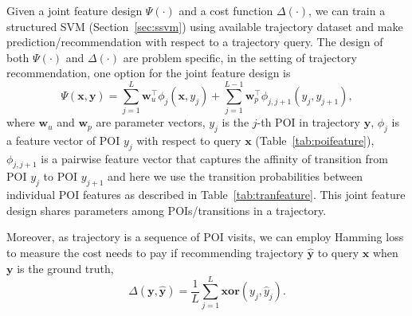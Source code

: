 \documentclass[9pt]{extarticle}
\DeclareMathOperator*{\argmax}{argmax}
\begin{document}
Given a joint feature design $\Psi(\cdot)$ and a cost function $\Delta(\cdot)$,
we can train a structured SVM (Section~\ref{sec:ssvm}) using available trajectory dataset and 
make prediction/recommendation with respect to a trajectory query.
The design of both $\Psi(\cdot)$ and $\Delta(\cdot)$ are problem specific,
in the setting of trajectory recommendation, one option for the joint feature design is
\begin{equation*}
\Psi(\mathbf{x}, \mathbf{y}) = \sum_{j=1}^L \mathbf{w}_u^\top \phi_j(\mathbf{x}, y_j) +
                               \sum_{j=1}^{L-1} \mathbf{w}_p^\top \phi_{j, j+1}(y_j, y_{j+1}),
\end{equation*}
where $\mathbf{w}_u$ and $\mathbf{w}_p$ are parameter vectors,
$y_j$ is the $j$-th POI in trajectory $\mathbf{y}$, 
$\phi_j$ is a feature vector of POI $y_j$ with respect to query $\mathbf{x}$ (Table~\ref{tab:poifeature}),
$\phi_{j,j+1}$ is a pairwise feature vector that captures the affinity of transition from POI $y_j$ to POI $y_{j+1}$ and
here we use the transition probabilities between individual POI features as described in Table~\ref{tab:tranfeature}.
This joint feature design shares parameters among POIs/transitions in a trajectory.

Moreover, as trajectory is a sequence of POI visits, we can employ Hamming loss to measure the cost needs to pay
if recommending trajectory $\hat{\mathbf{y}}$ to query $\mathbf{x}$ when $\mathbf{y}$ is the ground truth,
\begin{equation*}
\Delta(\mathbf{y}, \hat{\mathbf{y}}) = \frac{1}{L} \sum_{j=1}^L \mathbf{xor} (y_j, \hat{y}_j).
\end{equation*}


\end{document}
